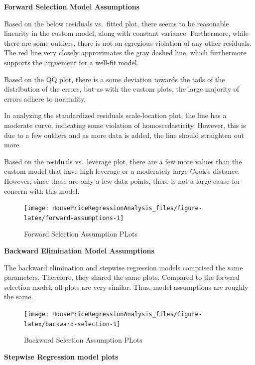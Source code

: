 \documentclass[american,]{article}
\begin{document}
\textbf{Forward Selection Model Assumptions}

Based on the below residuals vs.~fitted plot, there seems to be
reasonable linearity in the custom model, along with constant variance.
Furthermore, while there are some outliers, there is not an egregious
violation of any other residuals. The red line very closely approximates
the gray dashed line, which furthermore supports the arguement for a
well-fit model.

Based on the QQ plot, there is a some deviation towards the tails of the
distribution of the errors, but as with the custom plots, the large
majority of errors adhere to normality.

In analyzing the standardized residuals scale-location plot, the line
has a moderate curve, indicating some violation of homoscedasticity.
However, this is due to a few outliers and as more data is added, the
line should straighten out more.

Based on the residuals vs.~leverage plot, there are a few more values
than the custom model that have high leverage or a moderately large
Cook's distance. However, since these are only a few data points, there
is not a large cause for concern with this model.

\begin{figure}[htbp]

{\centering \texttt{[image: HousePriceRegressionAnalysis\_files/figure-latex/forward-assumptions-1]} 

}

\caption{Forward Selection Assumption PLots}\label{fig:forward-assumptions}
\end{figure}

\textbf{Backward Elimination Model Assumptions}

The backward elimination and stepwise regression models comprised the
same parameters. Therefore, they shared the same plots. Compared to the
forward selection model, all plots are very similar. Thus, model
assumptions are roughly the same.

\begin{figure}[htbp]

{\centering \texttt{[image: HousePriceRegressionAnalysis\_files/figure-latex/backward-selection-1]} 

}

\caption{Backward Selection Assumption PLots}\label{fig:backward-selection}
\end{figure}

\textbf{Stepwise Regression model plots}
\end{document}
